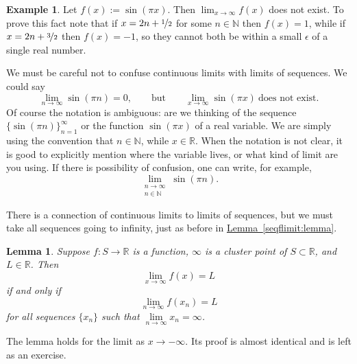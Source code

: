 \documentclass[12pt]{book}
\newcommand{\R}{{\mathbb{R}}}
\newcommand{\N}{{\mathbb{N}}}
\theoremstyle{plain}
\newtheorem{lemma}[thm]{Lemma}
\theoremstyle{remark}
\theoremstyle{definition}
\theoremstyle{exercise}
\theoremstyle{example}
\newtheorem{example}[thm]{Example}
\newcommand{\lemmaref}[1]{\hyperref[#1]{Lemma~\ref*{#1}}}
\begin{document}
\begin{example}
Let $f(x) := \sin(\pi x)$.  Then $\lim_{x\to\infty} f(x)$ does not exist.
To prove this fact note that if $x = 2n+\nicefrac{1}{2}$ for some $n \in \N$ then $f(x)=1$,
while if $x = 2n+\nicefrac{3}{2}$ then $f(x)=-1$, so they cannot both be
within a small $\epsilon$ of a single real number.

We must be careful not to confuse continuous limits with limits of sequences.
We could say
\begin{equation*}
\lim_{n \to \infty} \sin(\pi n) = 0, \qquad \text{but} \qquad
\lim_{x \to \infty} \sin(\pi x) ~ \text{does not exist}.
\end{equation*}
Of course the notation is ambiguous: are we thinking of the
sequence $\{ \sin (\pi n) \}_{n=1}^\infty$ or the function $\sin(\pi x)$
of a real variable.  We are simply using the convention
that $n \in \N$, while $x \in \R$.  When the notation is not clear,
it is good to explicitly mention where the variable lives, or what kind
of limit are you using.  If there is possibility of confusion, one can
write, for example,
\begin{equation*}
\lim_{\substack{n \to \infty\\n \in \N}} \sin(\pi n) .
\end{equation*}
\end{example}

There is a connection of continuous limits to limits of sequences, but we must take all
sequences going to infinity, just as before in \lemmaref{seqflimit:lemma}.

\begin{lemma} \label{seqflimitinf:lemma}
Suppose $f \colon S \to \R$ is a function, $\infty$ is a cluster
point of $S \subset \R$, and $L \in \R$.  Then
\begin{equation*}
\lim_{x\to\infty} f(x) = L
\end{equation*}
if and only if
\begin{equation*}
\lim_{n\to\infty} f(x_n) = L
\end{equation*}
for all sequences $\{ x_n \}$ such that $\lim\limits_{n\to\infty} x_n = \infty$.
\end{lemma}

The lemma holds for the limit as $x \to -\infty$.
Its proof is almost identical and
is left as an exercise.
\end{document}
